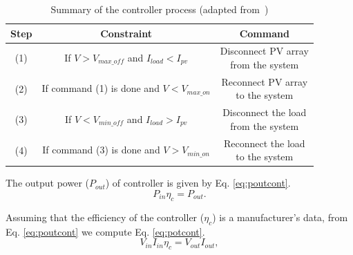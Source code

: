 \documentclass[review]{elsarticle}
\begin{document}
\begin{table}[!t]
\renewcommand{\arraystretch}{1.3}
\caption{Summary of the controller process (adapted from~\citep{Hansen})}
\label{table:controller}
\centering
\begin{tabular}{c | c | c }
\hline
\hline
Step  & Constraint & Command\\
\hline
\hline
(1) & \makecell{If $V > V_{max \_ off}$ \\and $I_{load} < I_{pv}$} & \makecell{Disconnect PV array \\from the system}\\
\hline
(2) & \makecell{If command (1) is \\done and $V < V_{max \_ on}$} & \makecell{Reconnect PV array \\to the system}\\
\hline
(3) & \makecell{If $V < V_{min \_ off}$ and \\ $I_{load} > I_{pv}$} & \makecell{Disconnect the load \\from the system}\\
\hline
(4) & \makecell{If command (3) is \\ done and $V > V_{min \_ on}$} & \makecell{Reconnect the load \\to the system}\\
\hline
\hline
\end{tabular}
\end{table}

%
The output power ($ P_{out} $) of controller is given by Eq. \eqref{eq:poutcont}.
\begin{equation}
\label{eq:poutcont}
P_{in} \eta_{c} = P_{out}.
\end{equation}

Assuming that the efficiency of the controller ($ \eta_{c} $) is a manufacturer's data, from Eq. \eqref{eq:poutcont} we compute Eq. \eqref{eq:potcont}.
\begin{equation}
\label{eq:potcont}
V_{in} I_{in} \eta_{c} = V_{out} I_{out},
\end{equation}
\end{document}

